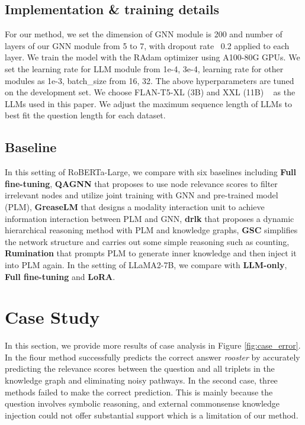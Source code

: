 \documentclass[11pt]{article}
\begin{document}
\subsection{Implementation \& training details}
\label{sec:implementation}
For our method, we set the dimension of GNN module is 200 and number of layers of our GNN module from 5 to 7, with dropout rate~\cite{drop} 0.2 applied to each layer. We train the model with the RAdam \cite{radam} optimizer using A100-80G GPUs. We set the learning rate for LLM module from {1e-4, 3e-4}, learning rate for other modules as 1e-3, batch\_size from {16, 32}. The above hyperparameters are tuned on the development set. We choose FLAN-T5-XL (3B) and XXL (11B) ~\cite{flan} as the LLMs used in this paper. We adjust the maximum sequence length of LLMs to best fit the question length for each dataset. 

\subsection{Baseline}
In this setting of RoBERTa-Large, we compare with six baselines including \textbf{Full fine-tuning}, \textbf{QAGNN} \cite{qagnn} that proposes to use node relevance scores to filter irrelevant nodes and utilize joint training with GNN and pre-trained model (PLM), \textbf{GreaseLM} that designs a modality interaction unit to achieve information interaction between PLM and GNN, \textbf{drlk} \cite{drlk} that proposes a dynamic hierarchical reasoning method with PLM and knowledge graphs, \textbf{GSC} \cite{counter} simplifies the network structure and carries out some simple reasoning such as counting, \textbf{Rumination} that prompts PLM to generate inner knowledge and then inject it into PLM again.
In the setting of LLaMA2-7B, we compare with \textbf{LLM-only}, \textbf{Full fine-tuning} and \textbf{LoRA}.


\section{Case Study}
\label{sec:case}
In this section, we provide more results of case analysis in Figure \ref{fig:case_error}. In the fiour method successfully predicts the correct answer \textit{rooster} by accurately predicting the relevance scores between the question and all triplets in the knowledge graph and eliminating noisy pathways. In the second case, three methods failed to make the correct prediction. This is mainly because the question involves symbolic reasoning, and external commonsense knowledge injection could not offer substantial support which is a limitation of our method.
\end{document}
